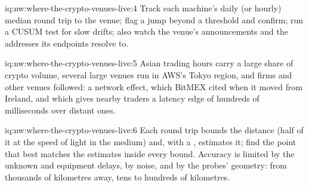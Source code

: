 \begin{solution}{iq:nw:where-the-crypto-venues-live:4}
Track each machine's daily (or hourly) median round trip to the venue; flag a jump beyond a threshold and confirm; run a CUSUM test for slow drifts;
also watch the venue's announcements and the addresses its endpoints resolve to.
\end{solution}

\begin{solution}{iq:nw:where-the-crypto-venues-live:5}
Asian trading hours carry a large share of crypto volume, several large venues run in AWS's Tokyo region, and firms and other venues followed: a
network effect, which BitMEX cited when it moved from Ireland, and which gives nearby traders a latency edge of hundreds of milliseconds over distant
ones.
\end{solution}

\begin{solution}{iq:nw:where-the-crypto-venues-live:6}
Each round trip bounds the distance (half of it at the speed of light in the medium) and, with a , estimates it; find the point that best
matches the estimates inside every bound. Accuracy is limited by the unknown  and equipment delays, by noise, and by the probes'
geometry: from thousands of kilometres away, tens to hundreds of kilometres.
\end{solution}
